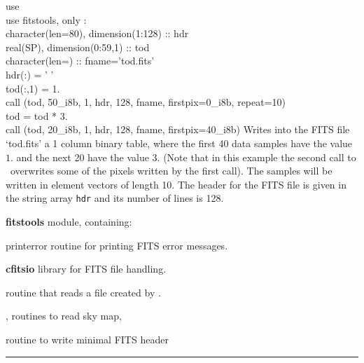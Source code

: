 \begin{example}
{
use  \\
use fitstools, only : \thedocid \\
character(len=80), dimension(1:128) :: hdr \\
real(SP), dimension(0:59,1) :: tod \\
character(len=) :: fname='tod.fits' \\
hdr(:) = ' ' \\
tod(:,1) = 1. \\
call \thedocid (tod, 50\_i8b, 1, hdr, 128, fname, firstpix=0\_i8b, repeat=10)  \\
tod = tod * 3. \\
call \thedocid (tod, 20\_i8b, 1, hdr, 128, fname, firstpix=40\_i8b)  
}
{
Writes into the FITS file `tod.fits' a 1 column binary table, where the first 40
data samples have the value $1.$ and the next 20 have the value $3.$ (Note that
in this example the
second call to \thedocid \ overwrites some of the pixels written by the first call). The samples will be
written in element vectors of length 10. The header for the FITS file is given in the
string array {\tt hdr} and its number of lines is 128. 
}
\end{example}

\begin{modules}
  \begin{sulist}{} %
  \item[\textbf{fitstools}] module, containing:
  \item[printerror] routine for printing FITS error messages.
  \item[\textbf{cfitsio}] library for FITS file handling.		
  \end{sulist}
\end{modules}

\begin{related}
  \begin{sulist}{} %
  \item[\htmlref{input\_tod*}{sub:input_tod}] routine that reads a file created by \thedocid. 
  \item[\htmlref{input\_map}{sub:input_map},
  \htmlref{read\_bintab}{sub:read_bintab}] routines to read \healpix sky map,
  \item[\htmlref{write\_minimal\_header}{sub:write_minimal_header}] routine to write minimal FITS header
  \end{sulist}
\end{related}

\rule{\hsize}{2mm}

\newpage
